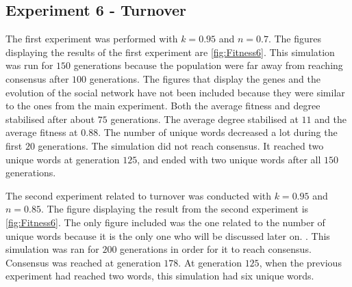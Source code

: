 \subsection{Experiment 6 - Turnover}
The first experiment was performed with $k = 0.95$ and $n = 0.7$. The figures displaying the results of the first experiment are \ref{fig:Fitness6}. This simulation was run for $150$ generations because the population were far away from reaching consensus after $100$ generations. The figures that display the genes and the evolution of the social network have not been included because they were similar to the ones from the main experiment. Both the average fitness and degree stabilised after about $75$ generations. The average degree stabilised at $11$ and the average fitness at $0.88$. The number of unique words decreased a lot during the first $20$ generations. The simulation did not reach consensus. It reached two unique words at generation $125$, and ended with two unique words after all $150$ generations.   

The second experiment related to turnover was conducted with $k = 0.95$ and $n = 0.85$. The figure displaying the result from the second experiment is \ref{fig:Fitness6}. The only figure included was the one related to the number of unique words because it is the only one who will be discussed later on. . This simulation was ran for $200$ generations in order for it to reach consensus. Consensus was reached at generation $178$. At generation $125$, when the previous experiment had reached two words, this simulation had six unique words. 


